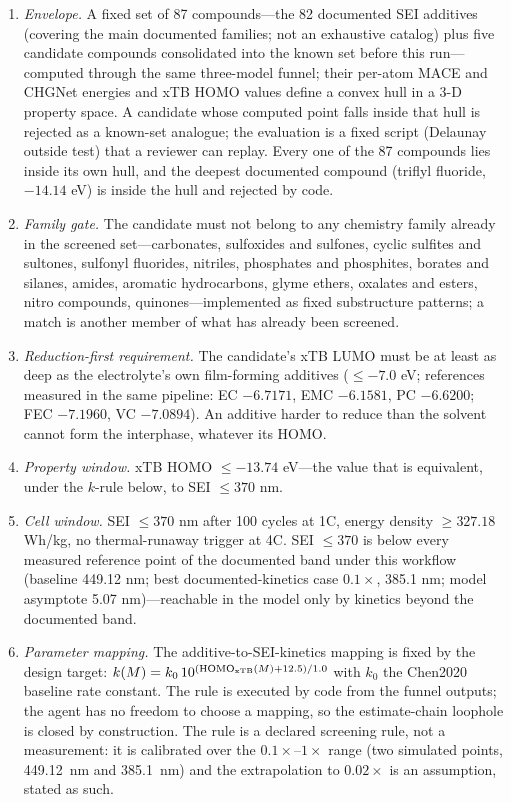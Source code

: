 \begin{enumerate}
\item \emph{Envelope.} A fixed set of 87 compounds---the 82 documented SEI
additives (covering the main documented families; not an exhaustive
catalog) plus five candidate compounds consolidated into the known set
before this run---computed through the same three-model funnel; their
per-atom MACE and CHGNet energies and xTB HOMO values define a convex
hull in a 3-D property space. A candidate whose computed point falls
inside that hull is rejected as a known-set analogue; the evaluation
is a fixed script (Delaunay outside test) that a reviewer can
replay. Every one of the 87 compounds lies inside its own hull, and the
deepest documented compound (triflyl fluoride, $-14.14$ eV) is inside
the hull and rejected by code.
\item \emph{Family gate.} The candidate must not belong to any chemistry
family already in the screened set---carbonates, sulfoxides and sulfones,
cyclic sulfites and sultones, sulfonyl fluorides, nitriles, phosphates and
phosphites, borates and silanes, amides, aromatic hydrocarbons, glyme
ethers, oxalates and esters, nitro compounds, quinones---implemented as
fixed substructure patterns; a match is another member of what has already
been screened.
\item \emph{Reduction-first requirement.} The candidate's xTB LUMO must be
at least as deep as the electrolyte's own film-forming additives
($\leq -7.0$ eV; references measured in the same pipeline: EC $-6.7171$,
EMC $-6.1581$, PC $-6.6200$; FEC $-7.1960$, VC $-7.0894$). An additive
harder to reduce than the solvent cannot form the interphase, whatever its
HOMO.
\item \emph{Property window.} xTB HOMO $\leq -13.74$ eV---the value that
is equivalent, under the $k$-rule below, to SEI $\leq 370$ nm.
\item \emph{Cell window.} SEI $\leq 370$ nm after 100 cycles at 1C,
energy density $\geq 327.18$ Wh/kg, no thermal-runaway trigger at 4C.
SEI $\leq 370$ is below every measured reference point of the documented
band under this workflow (baseline 449.12 nm; best documented-kinetics
case $0.1\times$, 385.1 nm; model asymptote 5.07 nm)---reachable in the
model only by kinetics beyond the documented band.
\item \emph{Parameter mapping.} The additive-to-SEI-kinetics mapping is
fixed by the design target: $k(M) = k_0\,10^{(\text{HOMO}_{\rm xTB}(M)+12.5)/1.0}$
with $k_0$ the Chen2020 baseline rate constant. The rule is executed by
code from the funnel outputs; the agent has no freedom to choose a
mapping, so the estimate-chain loophole is closed by construction. The
rule is a declared screening rule, not a measurement: it is calibrated
over the $0.1\times$--$1\times$ range (two simulated points,
449.12~nm and 385.1~nm) and the extrapolation to
$0.02\times$ is an assumption, stated as such.
\end{enumerate}

